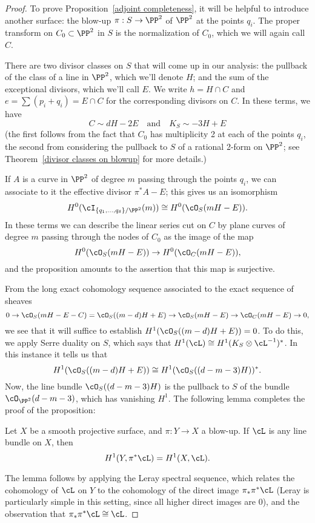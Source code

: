 \begin{proof}
To prove Proposition~\ref{adjoint completeness}, it will be helpful to introduce another surface: the blow-up $\pi : S \to \PP^2$ of $\PP^2$ at the points $q_i$. The proper transform on $C_0 \subset \PP^2$ in $S$ is the normalization of $C_0$, which we will again call $C$.

There are two divisor classes on $S$ that will come up in our analysis: the pullback of the class of a line in $\PP^2$, which we'll denote $H$; and the sum of the exceptional divisors, which we'll call $E$. We write $h= H\cap C$ and $e = \sum (p_i+q_i) = E\cap C$ for the corresponding divisors on $C$. In these terms, we have
$$
C \sim dH - 2E \quad \text{and} \quad K_S \sim -3H + E
$$
(the first follows from the fact that $C_0$ has multiplicity 2 at each of the points $q_i$, the second from considering the pullback to $S$ of a rational 2-form on $\PP^2$; see Theorem~\ref{divisor classes on blowup} for more details.)

 If $A$ is a curve in $\PP^2$ of degree $m$ passing through the points $q_i$, we can associate to it the effective divisor $\pi^*A - E$; this gives us an isomorphism
$$
H^0(\cI_{\{q_1,\dots,q_\delta\}/\PP^2}(m)) \cong H^0(\cO_S(mH-E)).
$$
In these terms we can describe the linear series cut on $C$ by plane curves of degree $m$ passing through the nodes of $C_0$ as the image of the map
$$
H^0(\cO_S(mH-E)) \to H^0(\cO_C(mH-E)),
$$
and the proposition amounts to the assertion that this map is surjective.

From the long exact cohomology sequence associated to the exact sequence of sheaves
$$
0 \to \cO_S(mH-E-C) = \cO_S((m-d)H + E)  \to \cO_S(mH-E) \to \cO_C(mH-E) \to 0,
$$
 we see that it will suffice to establish $H^1(\cO_S((m-d)H + E)) = 0$. To do this, we apply Serre duality on $S$, which says that $H^1(\cL) \cong H^1(K_S\otimes \cL^{-1})^*$. In this instance it 
tells us that
$$
H^1(\cO_S((m-d)H + E)) \cong H^1(\cO_S((d-m-3)H))^*.
$$
Now, the line bundle $\cO_S((d-m-3)H)$ is 
 the pullback to $S$ of the bundle $\cO_{\PP^2}(d-m-3)$, which has vanishing $H^1$. The following lemma completes the proof of the proposition:
\begin{lemma}
Let $X$ be a smooth projective surface, and $\pi : Y \to X$ a blow-up. If $\cL$ is any line bundle on $X$, then
$$
H^1(Y, \pi^*\cL) = H^1(X, \cL).
$$
\end{lemma}
The lemma follows by applying the Leray spectral sequence, which relates the cohomology of $\cL$ on $Y$ to the cohomology of the direct image $\pi_*\pi^*\cL$ (Leray is particularly simple in this setting, since all higher direct images are 0), and the observation that $\pi_*\pi^*\cL \cong \cL$.
\end{proof}

